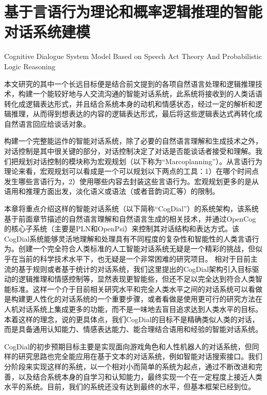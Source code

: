 \chapter{基于言语行为理论和概率逻辑推理的智能对话系统建模}{Cognitive Dialogue System Model Based on Speech Act Theory And Probabilistic Logic Reasoning}
\label{chap:dialogueModel}


本文研究的其中一个长远目标便是结合前文提到的各项自然语言处理和逻辑推理技术，构建一个能较好地与人交流沟通的智能对话系统，此系统将接收到的人类话语转化成逻辑表达形式，并且结合系统本身的动机和情感状态，经过一定的解析和逻辑推理，从而得到想表达的内容的逻辑表达形式，最后将这些逻辑表达式再转化成自然语言回应给谈话对象。

构建一个完整能运作的智能对话系统，除了必要的自然语言理解和生成技术之外，对话控制是其中很关键的部分，对话控制决定了对话是否能谈话者接受和理解。我们把规划对话控制的模块称为宏观规划（以下称为“Marcoplanning”）。从言语行为理论来看，宏观规划可以看成是一个可以规划以下两点的工具：1）在哪个时间点发生哪些言语行为，2）使用哪些内容去封装这些言语行为。宏观规划更多的是从语用和推理方面出发，淡化语义或语法（或者音韵词汇等）的限制。

       本章将重点介绍这样的智能对话系统（以下简称“CogDial”）的系统架构，该系统基于前面章节描述的自然语言理解和自然语言生成的相关技术，并通过OpenCog的核心子系统（主要是PLN和OpenPsi）来控制其对话结构和表达方式。该CogDial系统能够灵活地理解和处理具有不同程度的复杂性和智能性的人类言语行为。创建一个完全符合人类标准的人工智能对话系统无疑是一个精彩的挑战，但似乎在当前的科学技术水平下，也无疑是一个非常困难的研究项目。 相对于目前主流的基于规则或者基于统计的对话系统，我们这里提出的CogDial架构引入目标驱动的逻辑推理和情感控制等，显然表现更智能些，但还不足以完全达到符合人类智能标准。这样一个介于目前相关研究水平和完全人类水平之间的对话系统可以看做是构建更人性化的对话系统的一个重要步骤，或者看做是使用更可行的研究方法在人机对话系统上集成更多的功能，而不是一味地去盲目追求达到人类水平的目标。本着这样的理念，说的更具体点，我们CogDial的目标不是精确类似人类的对话，而是具备通用认知能力、情感表达能力、能合理结合语用和经验的智能对话系统。

         CogDial的初步预期目标主要是实现面向游戏角色和人性机器人的对话系统，但同样的研究思路也完全能应用在基于文本的对话系统，例如智能对话搜索接口。我们分阶段来实现这样的系统，以一个相对小而简单的系统为起点，通过不断改进和完善，以及结合系统本身的自学习和认知能力，最终实现一个在一定程度上接近人类水平的系统。目前，我们的系统还没有达到最终的水平，但基本框架已经到位。


